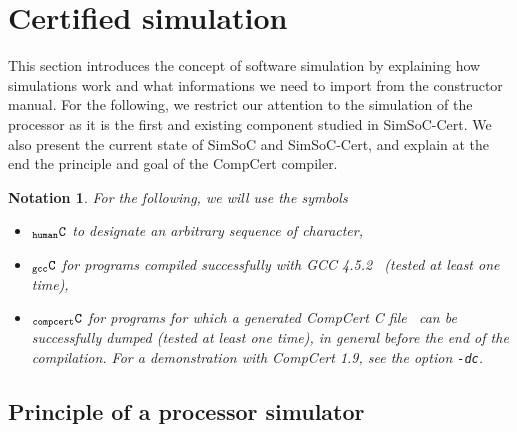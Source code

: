 \documentclass[a4paper, 11pt]{article}
\newcommand{\gcc}{GCC 4.5.2\xspace}
\newcommand{\compcert}{CompCert 1.9\xspace}
\newcommand{\ccert}{CompCert\xspace}
\newcommand{\C}{$_{\tt compcert}{\tt C}$\xspace}
\newcommand{\gccC}{$_{\tt gcc}{\tt C}$\xspace}
\newcommand{\hC}{$_{\tt human}{\tt C}$\xspace}
\newcommand{\simsoc}{SimSoC\xspace}
\newcommand{\SScert}{SimSoC-Cert\xspace}
\newtheorem*{note}{Notation}
\begin{document}
\section{Certified simulation}
\label{s:certi_sim}

This section introduces the concept of software simulation by explaining how simulations work and what informations we need to import from the constructor manual. For the following, we restrict our attention to the simulation of the processor as it is the first and existing component studied in \SScert. We also present the current state of \simsoc and \SScert, and explain at the end the principle and goal of the \ccert compiler.

\begin{note}
For the following, we will use the symbols
\begin{itemize}
\item \hC to designate an arbitrary sequence of character, 
\item \gccC for programs compiled successfully with \gcc~\cite{gcc} (tested at least one time),
\item \C for programs for which a generated \ccert C file~\cite{Leroy-Compcert-CACM} can be successfully dumped (tested at least one time), in general before the end of the compilation. For a demonstration with \compcert, see the option \verb|-dc|.
\end{itemize}
\end{note}

\subsection{Principle of a processor simulator}

\end{document}
